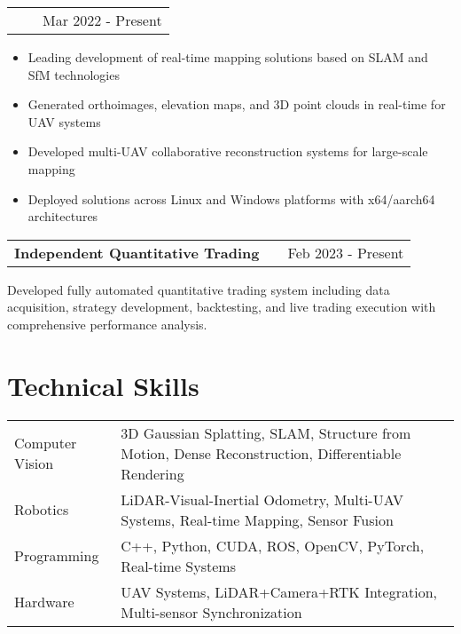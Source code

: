 \documentclass[a4paper,12pt]{article}
\makeatletter
\newenvironment{jobshort}[2]
    {
    \begin{tabularx}{\linewidth}{@{}l X r@{}}
    \textbf{#1} & \hfill &  #2 \\[3.75pt]
    \end{tabularx}
    }
    {
    }
\newenvironment{joblong}[2]
    {
    \begin{tabularx}{\linewidth}{@{}l X r@{}}
    \textbf{#1} & \hfill &  #2 \\[3.75pt]
    \end{tabularx}
    \begin{minipage}[t]{\linewidth}
    \begin{itemize}[nosep,after=\strut, leftmargin=1em, itemsep=3pt,label=--]
    }
    {
    \end{itemize}
    \end{minipage}    
    }
\makeatother
\begin{document}
\begin{joblong}{Technical Lead, \begin{CJK}{UTF8}{gbsn}西安视野慧图智能科技有限公司\end{CJK}}{Mar 2022 - Present}
\item Leading development of real-time mapping solutions based on SLAM and SfM technologies
\item Generated orthoimages, elevation maps, and 3D point clouds in real-time for UAV systems
\item Developed multi-UAV collaborative reconstruction systems for large-scale mapping
\item Deployed solutions across Linux and Windows platforms with x64/aarch64 architectures
\end{joblong}

\begin{jobshort}{Independent Quantitative Trading}{Feb 2023 - Present}
Developed fully automated quantitative trading system including data acquisition, strategy development, backtesting, and live trading execution with comprehensive performance analysis.
\end{jobshort}

\section{Technical Skills}
\begin{tabularx}{\linewidth}{@{}l X@{}}
Computer Vision &  \normalsize{3D Gaussian Splatting, SLAM, Structure from Motion, Dense Reconstruction, Differentiable Rendering}\\
Robotics  &  \normalsize{LiDAR-Visual-Inertial Odometry, Multi-UAV Systems, Real-time Mapping, Sensor Fusion}\\  
Programming &  \normalsize{C++, Python, CUDA, ROS, OpenCV, PyTorch, Real-time Systems}\\
Hardware &  \normalsize{UAV Systems, LiDAR+Camera+RTK Integration, Multi-sensor Synchronization}\\
\end{tabularx}

\vfill
\end{document}
